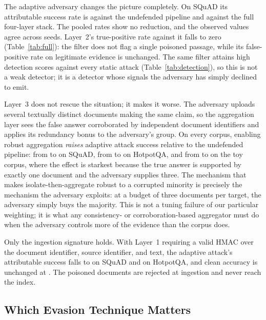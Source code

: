 The adaptive adversary changes the picture completely. On SQuAD its attributable success rate
is \casrAdaptiveSquadnone{} against the undefended pipeline and \casrAdaptiveSquadfull{}
against the full four-layer stack. The pooled rates show no reduction, and the observed values
agree across seeds.
Layer~2's true-positive rate against it falls to zero (Table~\ref{tab:full}): the filter does
not flag a single poisoned passage, while its false-positive rate on legitimate evidence is
unchanged. The same filter attains high detection scores against every static attack
(Table~\ref{tab:detection}), so this is not a weak detector; it is a detector whose signals the
adversary has simply declined to emit.

Layer~3 does not rescue the situation; it makes it worse. The adversary uploads several
textually distinct documents making the same claim, so the aggregation layer sees the false
answer corroborated by independent document identifiers and applies its redundancy bonus to the
adversary's group. On every corpus, enabling robust aggregation \emph{raises} adaptive attack
success relative to the undefended pipeline: from \casrAdaptiveSquadnone{} to
\casrAdaptiveSquadLThree{} on SQuAD, from \casrAdaptiveHotpotqanone{} to \casrAdaptiveHotpotqaLThree{}
on HotpotQA, and from \casrAdaptiveToynone{} to \casrAdaptiveToyLThree{} on the toy corpus, where
the effect is starkest because the true answer is supported by exactly one document and the
adversary supplies three. The mechanism that makes isolate-then-aggregate robust to a corrupted
minority is precisely the mechanism the adversary exploits: at a budget of three documents per
target, the adversary simply buys the majority. This is not a tuning failure of our particular
weighting; it is what any consistency- or corroboration-based aggregator must do when the
adversary controls more of the evidence than the corpus does.

Only the ingestion signature holds. With Layer~1 requiring a valid HMAC over the document
identifier, source identifier, and text,
the adaptive attack's attributable success falls to \casrAdaptiveSquadfullsigned{} on SQuAD and
\casrAdaptiveHotpotqafullsigned{} on HotpotQA, and clean accuracy is unchanged at
\cleanAccSquadfullsigned{}. The poisoned documents are rejected at ingestion and never reach
the index.



\subsection{Which Evasion Technique Matters}
\label{sec:res:evasion}

